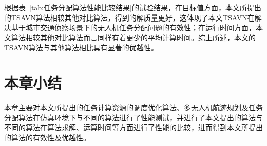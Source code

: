 根据表~\ref{tab:任务分配算法性能比较结果}的试验结果，在目标值方面，本文所提出的TSAVN算法相较其他对比算法，得到的解质量更好，这体现了本文TSAVN在解决基于城市交通侦察场景下的无人机任务分配问题的有效性；在运行时间方面，本文算法相较其他对比算法而言同样有着更少的平均计算时间。综上所述，本文的TSAVN算法与其他算法相比具有显著的优越性。

\section{本章小结}

本章主要对本文所提出的任务计算资源的调度优化算法、多无人机航迹规划及任务分配算法在仿真环境下与不同的算法进行了性能测试，并进行了本文提出的算法与不同的算法在算法求解、运算时间等方面进行了性能的比较，进而得到本文所提出的算法的有效性及优越性。

\newpage
